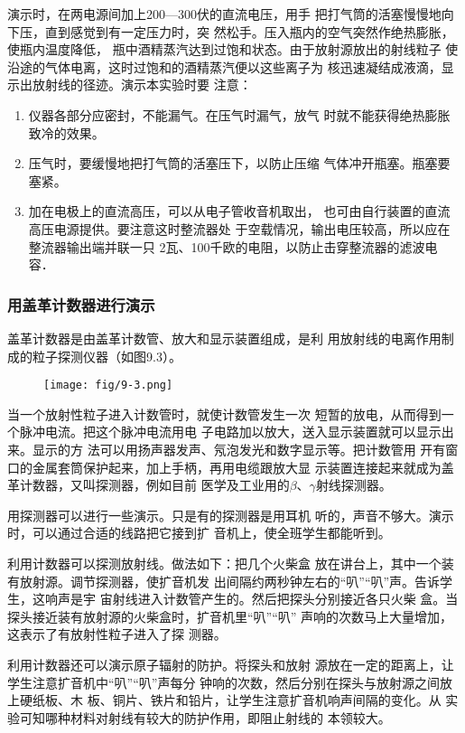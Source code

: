 演示时，在两电源间加上200—300伏的直流电压，用手
把打气筒的活塞慢慢地向下压，直到感觉到有一定压力时，突
然松手。压入瓶内的空气突然作绝热膨胀，使瓶内温度降低，
瓶中酒精蒸汽达到过饱和状态。由于放射源放出的射线粒子
使沿途的气体电离，这时过饱和的酒精蒸汽便以这些离子为
核迅速凝结成液滴，显示出放射线的径迹。演示本实验时要
注意：
\begin{enumerate}
    \item 仪器各部分应密封，不能漏气。在压气时漏气，放气
    时就不能获得绝热膨胀致冷的效果。
    \item 压气时，要缓慢地把打气筒的活塞压下，以防止压缩
    气体冲开瓶塞。瓶塞要塞紧。
    \item 加在电极上的直流高压，可以从电子管收音机取出，
    也可由自行装置的直流高压电源提供。要注意这时整流器处
    于空载情况，输出电压较高，所以应在整流器输出端并联一只
    2瓦、100千欧的电阻，以防止击穿整流器的滤波电容．
\end{enumerate}


\subsubsection{用盖革计数器进行演示}
盖革计数器是由盖革计数管、放大和显示装置组成，是利
用放射线的电离作用制成的粒子探测仪器（如图9.3）。
\begin{figure}[htp]
    \centering
    \texttt{[image: fig/9-3.png]}
    \caption{}
\end{figure}


当一个放射性粒子进入计数管时，就使计数管发生一次
短暂的放电，从而得到一个脉冲电流。把这个脉冲电流用电
子电路加以放大，送入显示装置就可以显示出来。显示的方
法可以用扬声器发声、氖泡发光和数字显示等。把计数管用
开有窗口的金属套筒保护起来，加上手柄，再用电缆跟放大显
示装置连接起来就成为盖革计数器，又叫探测器，例如目前
医学及工业用的$\beta$、$\gamma$射线探测器。

用探测器可以进行一些演示。只是有的探测器是用耳机
听的，声音不够大。演示时，可以通过合适的线路把它接到扩
音机上，使全班学生都能听到。

利用计数器可以探测放射线。做法如下：把几个火柴盒
放在讲台上，其中一个装有放射源。调节探测器，使扩音机发
出间隔约两秒钟左右的“叭”“叭”声。告诉学生，这响声是宇
宙射线进入计数管产生的。然后把探头分别接近各只火柴
盒。当探头接近装有放射源的火柴盒时，扩音机里“叭”“叭”
声响的次数马上大量增加，这表示了有放射性粒子进入了探
测器。

利用计数器还可以演示原子辐射的防护。将探头和放射
源放在一定的距离上，让学生注意扩音机中“叭”“叭”声每分
钟响的次数，然后分别在探头与放射源之间放上硬纸板、木
板、铜片、铁片和铅片，让学生注意扩音机响声间隔的变化。从
实验可知哪种材料对射线有较大的防护作用，即阻止射线的
本领较大。

